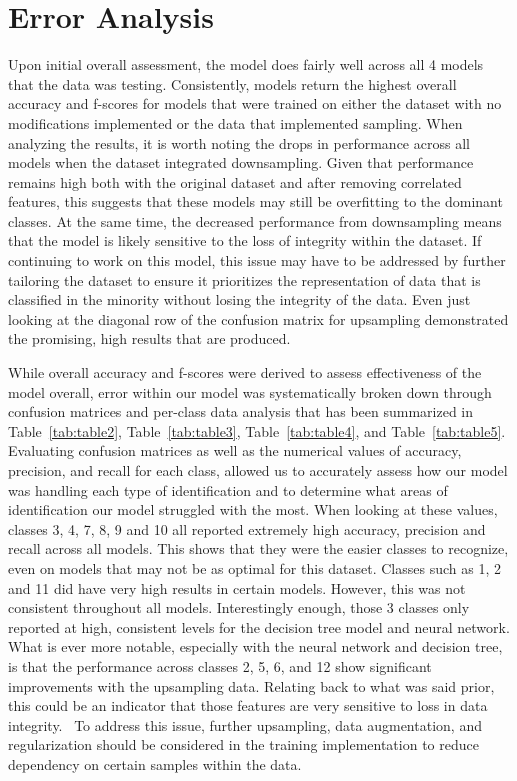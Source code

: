 \documentclass[11pt]{article}
\begin{document}
\section{Error Analysis}
\label{sec:Error Analysis}

Upon initial overall assessment, the model does fairly well across all 4 models that the data was testing. Consistently, models return the highest overall accuracy and f-scores for models that were trained on either the dataset with no modifications implemented or the data that implemented sampling. When analyzing the results, it is worth noting the drops in performance across all models when the dataset integrated downsampling. Given that performance remains high both with the original dataset and after removing correlated features, this suggests that these models may still be overfitting to the dominant classes. At the same time, the decreased performance from downsampling means that the model is likely sensitive to the loss of integrity within the dataset. If continuing to work on this model, this issue may have to be addressed by further tailoring the dataset to ensure it prioritizes the representation of data that is classified in the minority without losing the integrity of the data. Even just looking at the diagonal row of the confusion matrix for upsampling demonstrated the promising, high results that are produced. 

While overall accuracy and f-scores were derived to assess effectiveness of the model overall, error within our model was systematically broken down through confusion matrices and per-class data analysis that has been summarized in Table~\ref{tab:table2}, Table~\ref{tab:table3}, Table~\ref{tab:table4}, and Table~\ref{tab:table5}. Evaluating confusion matrices as well as the numerical values of accuracy, precision, and recall for each class, allowed us to accurately assess how our model was handling each type of identification and to determine what areas of identification our model struggled with the most. When looking at these values, classes 3, 4, 7, 8, 9 and 10 all reported extremely high accuracy, precision and recall across all models. This shows that they were the easier classes to recognize, even on models that may not be as optimal for this dataset. Classes such as 1, 2 and 11 did have very high results in certain models. However, this was not consistent throughout all models. Interestingly enough, those 3 classes only reported at high, consistent levels for the decision tree model and neural network. What is ever more notable, especially with the neural network and decision tree, is that the performance across classes 2, 5, 6, and 12 show significant improvements with the upsampling data. Relating back to what was said prior, this could be an indicator that those features are very sensitive to loss in data integrity.  To address this issue, further upsampling, data augmentation, and regularization should be considered in the training implementation to reduce dependency on certain samples within the data. 
\end{document}

